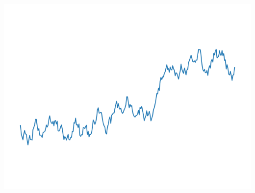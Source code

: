 \documentclass[11pt,class=report,crop=false]{standalone}
\begin{document}
\begin{exemple}
\begin{center}
\includegraphics[scale=\myscale,scale=0.2]{figures/landscape-06-05}


\end{center}
\end{exemple}
\end{document}
